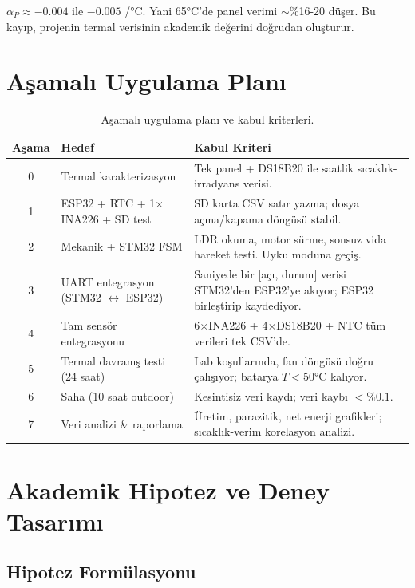 \documentclass[11pt,a4paper]{article}
\begin{document}
$\alpha_P \approx -0.004$ ile $-0.005$ /°C. Yani 65°C'de panel verimi $\sim$\%16-20 düşer. Bu kayıp, projenin termal verisinin akademik değerini doğrudan oluşturur.

\section{Aşamalı Uygulama Planı}

\begin{table}[h]
\centering
\renewcommand{\arraystretch}{1.4}
\begin{tabular}{|c|p{4cm}|p{8cm}|}
\hline
\rowcolor{primary!15}
\textbf{Aşama} & \textbf{Hedef} & \textbf{Kabul Kriteri} \\
\hline
0 & Termal karakterizasyon & Tek panel + DS18B20 ile saatlik sıcaklık-irradyans verisi. \\
\hline
1 & ESP32 + RTC + 1$\times$INA226 + SD test & SD karta CSV satır yazma; dosya açma/kapama döngüsü stabil. \\
\hline
2 & Mekanik + STM32 FSM & LDR okuma, motor sürme, sonsuz vida hareket testi. Uyku moduna geçiş. \\
\hline
3 & UART entegrasyon (STM32 $\leftrightarrow$ ESP32) & Saniyede bir [açı, durum] verisi STM32'den ESP32'ye akıyor; ESP32 birleştirip kaydediyor. \\
\hline
4 & Tam sensör entegrasyonu & 6$\times$INA226 + 4$\times$DS18B20 + NTC tüm verileri tek CSV'de. \\
\hline
5 & Termal davranış testi (24 saat) & Lab koşullarında, fan döngüsü doğru çalışıyor; batarya $T < 50$°C kalıyor. \\
\hline
6 & Saha (10 saat outdoor) & Kesintisiz veri kaydı; veri kaybı $< \%0.1$. \\
\hline
7 & Veri analizi \& raporlama & Üretim, parazitik, net enerji grafikleri; sıcaklık-verim korelasyon analizi. \\
\hline
\end{tabular}
\caption{Aşamalı uygulama planı ve kabul kriterleri.}
\end{table}

\section{Akademik Hipotez ve Deney Tasarımı}

\subsection{Hipotez Formülasyonu}
\end{document}

